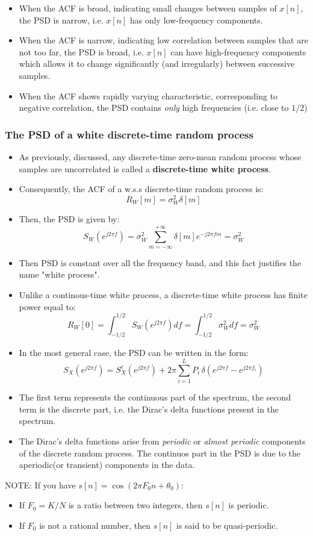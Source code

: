 \begin{itemize}
    \item When the ACF is broad, indicating small changes between samples of \(x[n]\), the PSD is narrow, i.e. \(x[n]\) has only low-frequency components.
    \item When the ACF is narrow, indicating low correlation between samples that are not too far, the PSD is broad, i.e. \(x[n]\) can have high-frequency components which allows it to change significantly (and irregularly) between successive samples.
    \item When the ACF shows rapidly varying characteristic, corresponding to negative correlation, the PSD contains \textit{only} high frequencies (i.e. close to \(1/2\))
\end{itemize}
\subsubsection{The PSD of a white discrete-time random process}
\begin{itemize}
    \item As previously, discussed, any discrete-time zero-mean random process whose samples are uncorrelated is called a \textbf{discrete-time white process}.
    \item Consequently, the ACF of a w.s.s discrete-time random process is:
    \[
    R_W[m]=\sigma^2_W\delta[m]
    \]
    \item Then, the PSD is given by:
    \[
    S_W(e^{j2\pi f})=\sigma_W^2\sum_{m=-\infty}^{+\infty}\delta[m]e^{-j2\pi f m}=\sigma_W^2
    \]
    \item Then PSD is constant over all the frequency band, and this fact justifies the name "white process".
    \item Unlike a continous-time white process, a discrete-time white process has finite power equal to:
    \[
    R_W[0]=\int_{-1/2}^{1/2}S_W(e^{j2\pi f})df=\int_{-1/2}^{1/2}\sigma_W^2df=\sigma_W^2
    \]
    \item In the most general case, the PSD can be written in the form:
    \[
S_X(e^{j2\pi f}) = S_X^c(e^{j2\pi f}) + 2\pi \sum_{i=1}^L P_i \, \delta\left( e^{j2\pi f} - e^{j2\pi f_i} \right)
\]
    \item The first term represents the continuous part of the spectrum, the second term is the discrete part, i.e. the Dirac's delta functions present in the spectrum.
    \item The Dirac's delta functions arise from \textit{periodic} or \textit{almost periodic} components of the discrete random process. The continuos part in the PSD is due to the aperiodic(or transient) components in the data.

\end{itemize}
NOTE: If you have \(s[n]=\cos(2\pi F_0n+\theta_0)\):
\begin{itemize}
    \item If \(F_0=K/N\) is a ratio between two integers, then \(s[n]\) is periodic.
    \item If \(F_0\) is not a rational number, then \(s[n]\) is said to be quasi-periodic.
\end{itemize}

